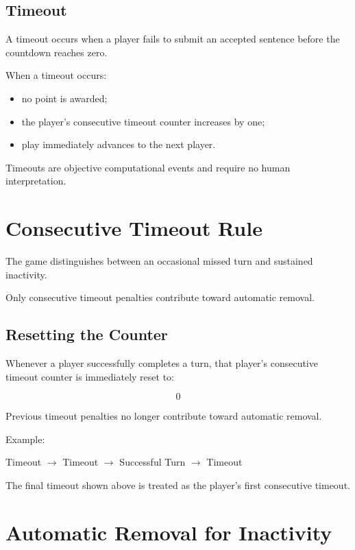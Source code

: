 \documentclass[11pt,a4paper]{article}
\begin{document}
\subsection{Timeout}

A timeout occurs when a player fails to submit an accepted sentence before the countdown reaches zero.

When a timeout occurs:

\begin{itemize}
    \item no point is awarded;
    \item the player's consecutive timeout counter increases by one;
    \item play immediately advances to the next player.
\end{itemize}

Timeouts are objective computational events and require no human interpretation.

\section{Consecutive Timeout Rule}

The game distinguishes between an occasional missed turn and sustained inactivity.

Only consecutive timeout penalties contribute toward automatic removal.

\subsection{Resetting the Counter}

Whenever a player successfully completes a turn, that player's consecutive timeout counter is immediately reset to:

\[
0
\]

Previous timeout penalties no longer contribute toward automatic removal.

Example:

\begin{center}
Timeout $\rightarrow$ Timeout $\rightarrow$ Successful Turn $\rightarrow$ Timeout
\end{center}

The final timeout shown above is treated as the player's first consecutive timeout.

\section{Automatic Removal for Inactivity}
\end{document}

